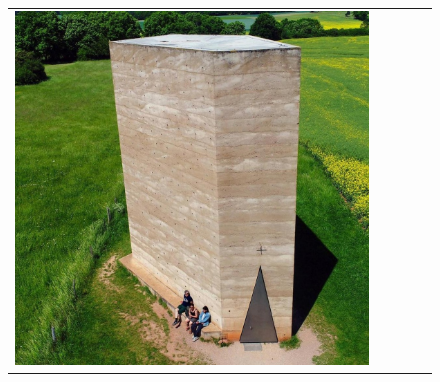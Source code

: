 \begin{figure}[H]
{\begin{tabular}{@{}ccccc@{}}
      \includegraphics[width=\linewidth]{Images/LoRAs/STAMPBETON/Training_images/10.jpg} \\[2pt]


\end{tabular}}
\end{figure}
